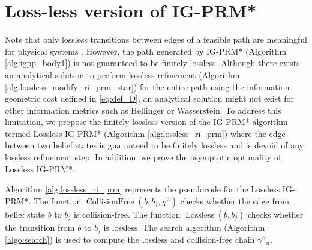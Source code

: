 \documentclass[Afour,sageh,times]{sagej}
\begin{document}
\section{Loss-less version of IG-PRM*\label{sec:lossless_ri_prm_star}}
Note that only lossless transitions between edges of a feasible path are meaningful for physical systems \cite{pedram2021gaussian}. However, the path generated by IG-PRM* (Algorithm \ref{alg:igpp_body1}) is not guaranteed to be finitely lossless. Although there exists an analytical solution to perform lossless refinement (Algorithm \ref{alg:lossless_modify_ri_prm_star}) for the entire path using the information geometric cost defined in \eqref{eq:def_D}, an analytical solution might not exist for other information metrics such as Hellinger or Wasserstein. To address this limitation, we propose the finitely lossless version of the IG-PRM* algorithm termed Lossless IG-PRM* (Algorithm \ref{alg:lossless_ri_prm}) where the edge between two belief states is guaranteed to be finitely lossless and is devoid of any lossless refinement step. In addition, we prove the asymptotic optimality of Lossless IG-PRM*. 

Algorithm \ref{alg:lossless_ri_prm} represents the pseudocode for the Lossless IG-PRM*. The function $\operatorname{CollisionFree}(b, b_j, \chi^2)$ checks whether the edge from belief state $b$ to $b_j$ is collision-free. The function $\operatorname{Lossless}(b, b_j)$ checks whether the transition from $b$ to $b_j$ is lossless. The search algorithm (Algorithm \ref{algo:search}) is used to compute the lossless and collision-free chain $\gamma''_n$.
\end{document}

